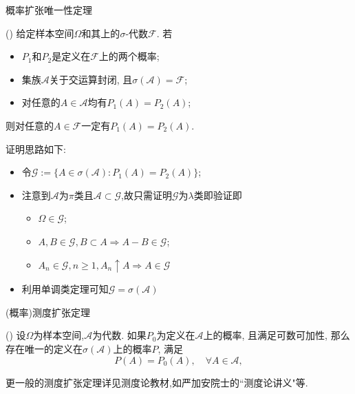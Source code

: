 \begin{frame}{概率扩张唯一性定理}
\begin{thm}() 给定样本空间${\Omega}$和其上的${\sigma}$-代数$\mathcal{F}$. 若
\begin{itemize}[<+-|alert@+>]
	\item $P_{1}$和${P_{2}}$是定义在${\mathcal{F}}$上的两个概率;
	\item 集族${\mathcal{A}}$关于交运算封闭, 且${\sigma(\mathcal{A})=\mathcal{F}}$;
	\item 对任意的$A\in \mathcal{A}$均有${P_{1}(A)=P_{2}(A)}$;
\end{itemize}\pause
则对任意的$A\in \mathcal{F}$一定有${P_{1}(A)=P_{2}(A)}$.
\end{thm}
\pause

\zheng 证明思路如下:
	\begin{itemize}[<+-|alert@+>]
	\item 令$\mathcal{G}:=\{A\in \sigma(\mathcal{A}):P_1(A)=P_2(A)\}$;
	\item 注意到$\mathcal{A}$为$\pi$类且$\mathcal{A}\subset \mathcal{G}$,故只需证明$\mathcal{G}$为$\lambda$类即验证即
	  \begin{itemize}[<+-|alert@+>]
	  \item $\Omega\in \mathcal{G}$;
	  \item $A, B\in \mathcal{G}, B\subset A\Rightarrow A-B\in \mathcal{G}$;
	  \item $A_n\in \mathcal{G}, n\geq 1, A_n\uparrow A\Rightarrow A\in \mathcal{G}$
	  \end{itemize}
	\item 利用单调类定理可知$\mathcal{G}=\sigma(\mathcal{A})$
	\end{itemize}


\end{frame}


\begin{frame}{(概率)测度扩张定理}
\begin{thm}() 设$\Omega$为样本空间,$\mathcal{A}$为代数. %
如果$P_{0}$为定义在$\mathcal{A}$上的概率, 且满足可数可加性, 那么存在唯一的定义在$\sigma(\mathcal{A})$上的概率$P$, 满足
	\[
	P(A)=P_{0}(A),  \quad \forall A \in \mathcal{A},
	\]
\end{thm}


\begin{rmk}
更一般的测度扩张定理详见测度论教材,如严加安院士的``测度论讲义"等.
\end{rmk}
\end{frame}

